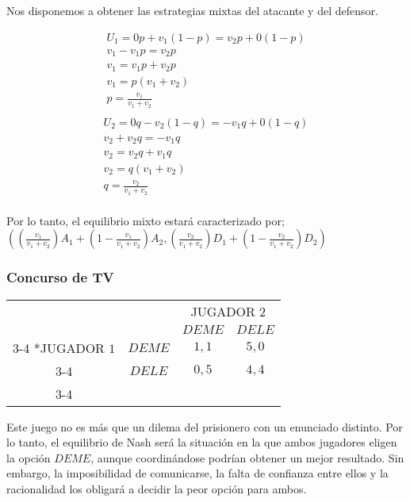 \documentclass[12pt]{article}
\begin{document}
    \begin{flushleft}
        Nos disponemos a obtener las estrategias mixtas del atacante y del defensor.
    \end{flushleft}
    \begin{align*}
        U_1 = 0p + v_1(1-p) = v_2p + 0(1-p)\\
        v_1 - v_1p = v_2p\\
        v_1 = v_1p + v_2p\\
        v_1 = p(v_1+v_2)\\
        p = \frac{v_1}{v_1+v_2}\\
    \end{align*}
    \begin{align*}
        U_2 = 0q - v_2(1-q) = -v_1q + 0(1-q)\\
        v_2 + v_2q = -v_1q\\
        v_2 = v_2q + v_1q\\
        v_2 = q(v_1+v_2)\\
        q = \frac{v_2}{v_1+v_2}\\
    \end{align*}
    \begin{flushleft}
        Por lo tanto, el equilibrio mixto estará caracterizado por; $\left(\left(\frac{v_1}{v_1+v_2}\right)A_1+\left(1-\frac{v_1}{v_1+v_2}\right)A_2,\left(\frac{v_2}{v_1+v_2}\right)D_1+\left(1-\frac{v_2}{v_1+v_2}\right)D_2   \right)$
    \end{flushleft}
\subsubsection{Concurso de TV}
\begin{center}    
    \setlength{\extrarowheight}{0pt}
    \begin{tabular}{cc|c|c|}
        & \multicolumn{1}{c}{} & \multicolumn{2}{c}{JUGADOR $2$}\\
        & \multicolumn{1}{c}{} & \multicolumn{1}{c}{$DEME$}  & \multicolumn{1}{c}{$DELE$} \\\cline{3-4}
        \multirow{2}*{JUGADOR $1$}  & $DEME$ & $1,1$ & $5,0$ \\\cline{3-4}
        & $DELE$ & $0,5$ & $4,4$ \\\cline{3-4}
    \end{tabular}
\end{center}
\begin{flushleft}
    Este juego no es más que un dilema del prisionero con un enunciado distinto. Por lo tanto, el equilibrio de Nash será la situación en la que ambos jugadores eligen la opción $DEME$, aunque coordinándose podrían obtener un mejor resultado. Sin embargo, la imposibilidad de comunicarse, la falta de confianza entre ellos y la racionalidad los obligará a decidir la peor opción para ambos.
\end{flushleft}
\end{document}
